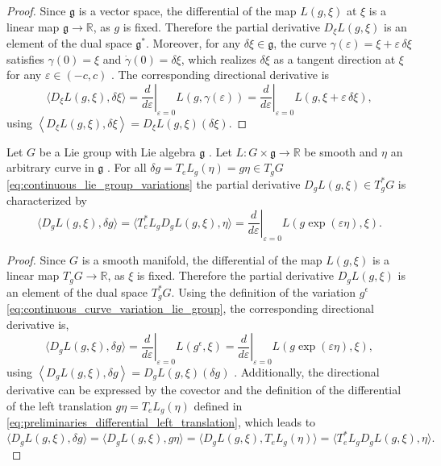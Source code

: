 \begin{proof}
Since $\mathfrak g$ is a vector space, the differential of the map $L(g,\xi)$ at $\xi$ is a linear map $\mathfrak g\to\mathbb R$, as $g$ is fixed. Therefore the partial derivative $D_{\xi}L(g,\xi)$ is an element of the dual space $\mathfrak g^*$. Moreover, for any $\delta\xi\in\mathfrak g$, the curve
$\gamma(\varepsilon)=\xi+\varepsilon\,\delta\xi$ satisfies $\gamma(0)=\xi$ and $\dot\gamma(0)=\delta\xi$, which realizes $\delta\xi$ as a tangent direction at $\xi$  for any $\varepsilon \in (-c,c)$ \cite{Lee2008}.
The corresponding directional derivative is
\[
\langle D_\xi L(g,\xi),\delta\xi\rangle
=
\left.\frac{d}{d\varepsilon}\right|_{\varepsilon=0} L(g,\gamma(\varepsilon))
=
\left.\frac{d}{d\varepsilon}\right|_{\varepsilon=0}L(g,\xi+\varepsilon\,\delta\xi),
\]
using $\left\langle D_\xi L(g,\xi),\delta\xi\right\rangle
=
D_\xi L(g,\xi)(\delta\xi)$.
\end{proof}


\begin{proposition}
Let $G$ be a Lie group with Lie algebra $\mathfrak g$ \cite{Hall2000LieGroups}. Let $L:G\times\mathfrak g\to\mathbb R$
be smooth and $\eta$ an arbitrary curve in $\mathfrak g$ . For all $\delta g=T_eL_g(\eta)=g\eta\in T_gG$ \eqref{eq:continuous_lie_group_variations} 
the partial derivative $D_g L(g,\xi)\in T_g^*G$ is characterized by
\begin{equation} \label{eq:derivative_rotation}
\langle D_g L(g,\xi),\delta g\rangle
=
\langle T_{e}^{*}L_{g} D_g L(g,\xi),\eta \rangle
=
\left.\frac{d}{d\varepsilon}\right|_{\varepsilon=0}L(g\exp{(\varepsilon \eta)},\xi).
\end{equation}
\end{proposition}

\begin{proof}
Since $G$ is a smooth manifold, the differential of the map $L(g,\xi)$ is a linear map $T_gG\to\mathbb R$, as $\xi$ is fixed. Therefore the partial derivative $D_gL(g,\xi)$ is an element of the dual space $T_g^*G$. 
Using the definition of the variation $g^{\epsilon}$ \eqref{eq:continuous_curve_variation_lie_group}, the corresponding directional derivative is,
\[
\langle D_g L(g,\xi),\delta g\rangle
= \left.\frac{d}{d\varepsilon}\right|_{\varepsilon=0}L(g^{\epsilon},\xi)
= \left.\frac{d}{d\varepsilon}\right|_{\varepsilon=0}L(g\exp{(\varepsilon \eta)},\xi),
\]
using $\left\langle D_g L(g,\xi),\delta g\right\rangle
=
D_g L(g,\xi)(\delta g)$ \cite{Lee2008}. Additionally, the directional derivative can be expressed by the covector and 
the definition of the
differential of the left translation $g \eta = T_eL_g(\eta)$ defined in \eqref{eq:preliminaries_differential_left_translation}, which leads to  
\[
\langle D_g L(g,\xi),\delta g\rangle
= \langle D_g L(g,\xi),g \eta \rangle
= \langle D_g L(g,\xi), T_eL_g(\eta) \rangle
= \langle T_e ^* L_g D_g L(g,\xi), \eta \rangle.
\]
\end{proof}


